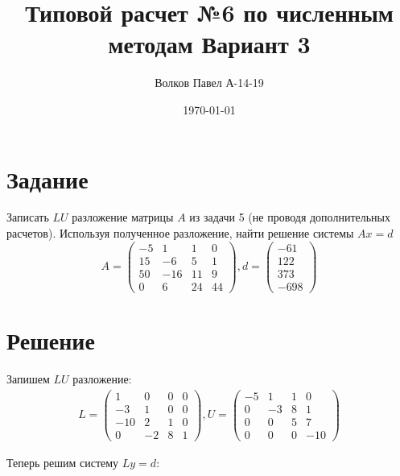 \documentclass[a4paper,12pt]{report} %
\author{Волков Павел А-14-19}
\title{Типовой расчет №6 по численным методам Вариант 3}
\date{\today}
\begin{document}

\maketitle

\newpage
\section*{Задание}
Записать $LU$ разложение матрицы $A$ из задачи 5 (не проводя дополнительных расчетов). Используя полученное разложение, найти решение системы $Ax = d$
\[
	A = 
	\begin{pmatrix}
		-5 & 1 & 1 & 0 \\
		15 & -6 & 5 & 1 \\
		50 & -16 & 11 & 9 \\
		0 & 6 & 24 & 44
	\end{pmatrix}, d = 
	\begin {pmatrix}
		-61 \\ 122 \\ 373 \\ -698
	\end{pmatrix}
\]

\section*{Решение}

Запишем $LU$ разложение:
\begin{gather*}
	L = 
	\begin{pmatrix}
		1 & 0 & 0 & 0 \\
		-3 & 1 & 0 & 0 \\
		-10 & 2 & 1 & 0 \\
		0 & -2 & 8 & 1
	\end{pmatrix},
	U = 
	\begin{pmatrix}
		-5 & 1 & 1 & 0 \\
		0 & -3 & 8 & 1 \\
		0 & 0 & 5 & 7 \\
		0 & 0 & 0 & -10
	\end{pmatrix}
\end{gather*}
 
Теперь решим систему $Ly = d$:
\end{document}

